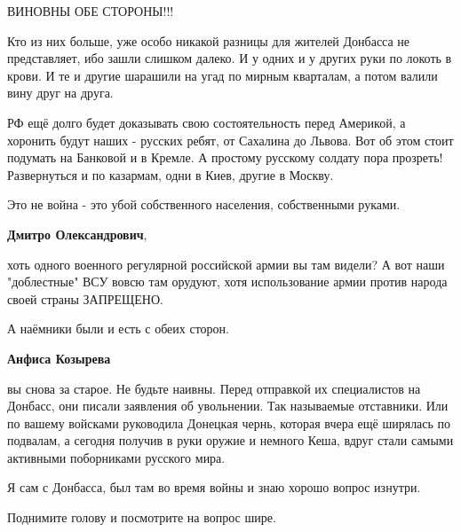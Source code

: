\begin{itemize}
ВИНОВНЫ ОБЕ СТОРОНЫ!!!

Кто из них больше, уже особо никакой разницы для жителей Донбасса не
представляет, ибо зашли слишком далеко. И у одних и у других руки по локоть в
крови. И те и другие шарашили на угад по мирным кварталам, а потом валили вину
друг на друга.

РФ ещё долго будет доказывать свою состоятельность перед Америкой, а хоронить
будут наших - русских ребят, от Сахалина до Львова. Вот об этом стоит подумать
на Банковой и в Кремле. А простому русскому солдату пора прозреть! Развернуться
и по казармам, одни в Киев, другие в Москву.

Это не война - это убой собственного населения, собственными руками.

\begin{itemize}

 
\textbf{Дмитро Олександрович}, 

хоть одного военного регулярной российской армии вы там видели? А вот наши
"доблестные" ВСУ вовсю там орудуют, хотя использование армии против народа
своей страны ЗАПРЕЩЕНО.

А наёмники были и есть с обеих сторон.

 
\textbf{Анфиса Козырева} 

вы снова за старое. Не будьте наивны. Перед отправкой их специалистов на
Донбасс, они писали заявления об увольнении. Так называемые отставники. Или по
вашему войсками руководила Донецкая чернь, которая вчера ещё ширялась по
подвалам, а сегодня получив в руки оружие и немного Кеша, вдруг стали самыми
активными поборниками русского мира.

Я сам с Донбасса, был там во время войны и знаю хорошо вопрос изнутри.

Поднимите голову и посмотрите на вопрос шире.


 

\end{itemize}
\end{itemize}
